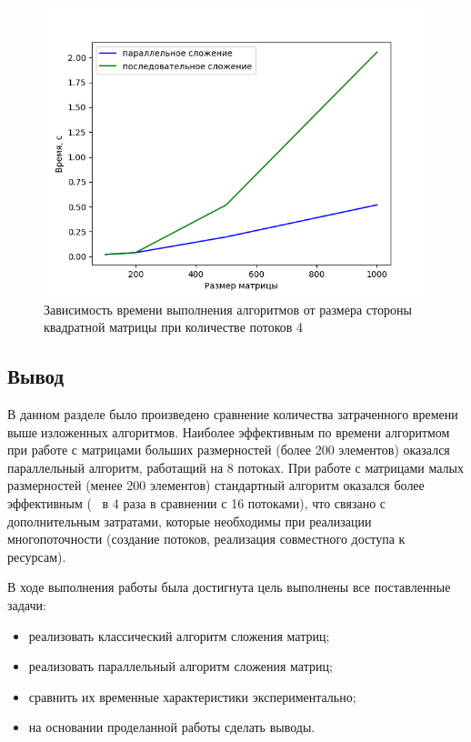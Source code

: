 \begin{figure}
    \centering
    \includegraphics[scale=0.65]{sizes.png}
    \caption{Зависимость времени выполнения алгоритмов от размера стороны квадратной матрицы при количестве потоков 4}
    \label{img:plot_worst}
\end{figure}

\subsection{Вывод}

В данном разделе было произведено сравнение количества затраченного времени вышеизложенных алгоритмов.
Наиболее эффективным по времени алгоритмом при работе с матрицами больших размерностей (более 200 элементов) оказался параллельный алгоритм, работащий на 8 потоках.
При работе с матрицами малых размерностей (менее 200 элементов) стандартный алгоритм оказался более эффективным (~ в 4 раза в сравнении с 16 потоками), что связано с дополнительным затратами, которые необходимы при реализации многопоточности (создание потоков, реализация совместного доступа к ресурсам).




В ходе выполнения работы была достигнута цель выполнены все поставленные задачи:

\begin{itemize}
    \item реализовать классический алгоритм сложения матриц;
    \item реализовать параллельный алгоритм сложения матриц;
    \item сравнить их временные характеристики экспериментально;
    \item на основании проделанной работы сделать выводы.
\end{itemize}

